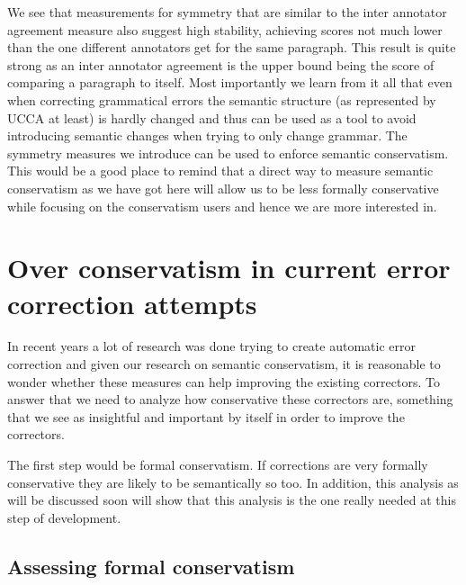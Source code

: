 \documentclass[11pt]{article}
\begin{document}
We see that measurements for symmetry that are similar to the inter
annotator agreement measure also suggest high stability, achieving
scores not much lower than the one different annotators get for the
same paragraph. This result is quite strong as an inter annotator
agreement is the upper bound being the score of comparing a paragraph
to itself. Most importantly we learn from it all that even when correcting
grammatical errors the semantic structure (as represented by UCCA
at least) is hardly changed and thus can be used as a tool to avoid
introducing semantic changes when trying to only change grammar. The
symmetry measures we introduce can be used to enforce semantic conservatism.
This would be a good place to remind that a direct way to measure
semantic conservatism as we have got here will allow us to be less
formally conservative while focusing on the conservatism users and
hence we are more interested in.

\section{Over conservatism in current error correction attempts}

In recent years a lot of research was done trying to create automatic
error correction\cite{rozovskaya2014building,rozovskaya2010annotating,ng2014conll,kao2013conll}
and given our research on semantic conservatism, it is reasonable
to wonder whether these measures can help improving the existing correctors.
To answer that we need to analyze how conservative these correctors
are, something that we see as insightful and important by itself in
order to improve the correctors.

The first step would be formal conservatism. If corrections are very
formally conservative they are likely to be semantically so too. In
addition, this analysis as will be discussed soon will show that this
analysis is the one really needed at this step of development.

\subsection{Assessing formal conservatism}
\end{document}

